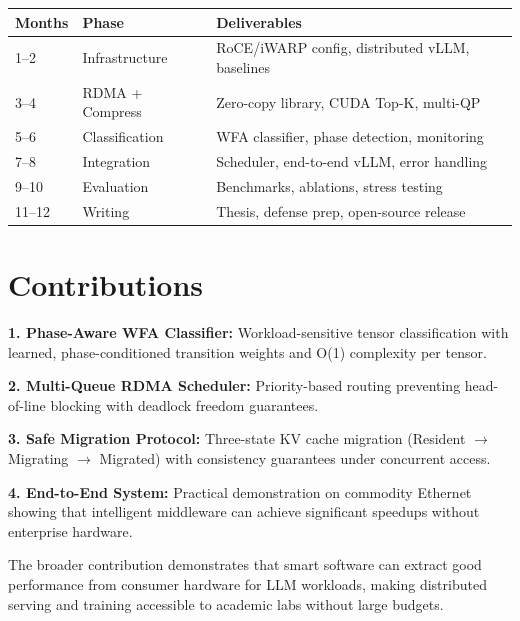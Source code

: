 \documentclass[10pt,letterpaper]{article}
\begin{document}
\begin{table}[h]
\vspace{-8pt}
\centering
\small
\begin{tabular}{@{}p{1.5cm}p{2.5cm}p{9cm}@{}}
\toprule
\textbf{Months} & \textbf{Phase} & \textbf{Deliverables} \\
\midrule
1--2 & Infrastructure & RoCE/iWARP config, distributed vLLM, baselines \\
3--4 & RDMA + Compress & Zero-copy library, CUDA Top-K, multi-QP \\
5--6 & Classification & WFA classifier, phase detection, monitoring \\
7--8 & Integration & Scheduler, end-to-end vLLM, error handling \\
9--10 & Evaluation & Benchmarks, ablations, stress testing \\
11--12 & Writing & Thesis, defense prep, open-source release \\
\bottomrule
\end{tabular}
\vspace{-8pt}
\end{table}

\section{Contributions}

\textbf{1. Phase-Aware WFA Classifier:} Workload-sensitive tensor classification with learned, phase-conditioned transition weights and O(1) complexity per tensor.

\textbf{2. Multi-Queue RDMA Scheduler:} Priority-based routing preventing head-of-line blocking with deadlock freedom guarantees.

\textbf{3. Safe Migration Protocol:} Three-state KV cache migration (Resident $\to$ Migrating $\to$ Migrated) with consistency guarantees under concurrent access.

\textbf{4. End-to-End System:} Practical demonstration on commodity Ethernet showing that intelligent middleware can achieve significant speedups without enterprise hardware.

The broader contribution demonstrates that smart software can extract good performance from consumer hardware for LLM workloads, making distributed serving and training accessible to academic labs without large budgets.
\end{document}
